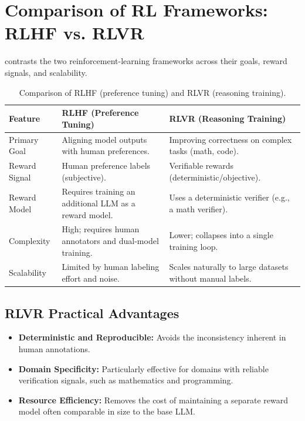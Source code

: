 ﻿\section{Comparison of RL Frameworks: RLHF vs. RLVR}
\label{sec:discussion}


 contrasts the two reinforcement-learning
frameworks across their goals, reward signals, and scalability.

\begin{table}[H]
  \centering
  \caption{Comparison of RLHF (preference tuning) and RLVR
    (reasoning training).}
  \label{tab:rlhf-vs-rlvr}
  \begin{tabular}{p{} p{} p{}}
    \toprule
    \textbf{Feature} & \textbf{RLHF (Preference Tuning)}
      & \textbf{RLVR (Reasoning Training)} \\
    \midrule
    Primary Goal & Aligning model outputs with human preferences.
      & Improving correctness on complex tasks (math, code). \\
    \addlinespace
    Reward Signal & Human preference labels (subjective).
      & Verifiable rewards (deterministic/objective). \\
    \addlinespace
    Reward Model & Requires training an additional LLM as a reward model.
      & Uses a deterministic verifier (e.g., a math verifier). \\
    \addlinespace
    Complexity & High; requires human annotators and dual-model training.
      & Lower; collapses into a single training loop. \\
    \addlinespace
    Scalability & Limited by human labeling effort and noise.
      & Scales naturally to large datasets without manual labels. \\
    \bottomrule
  \end{tabular}
\end{table}

\subsection{RLVR Practical Advantages}

\begin{itemize}
    \item \textbf{Deterministic and Reproducible:} Avoids the inconsistency inherent in human annotations.
    \item \textbf{Domain Specificity:} Particularly effective for domains with reliable verification signals, such as mathematics and programming.
    \item \textbf{Resource Efficiency:} Removes the cost of maintaining a separate reward model often comparable in size to the base LLM.
\end{itemize}